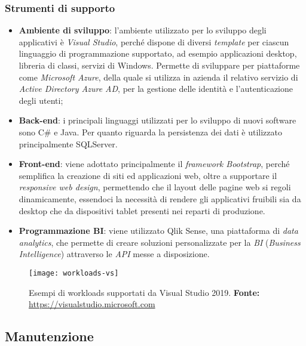 \subsubsection{Strumenti di supporto}
\begin{itemize}
	\item \textbf{Ambiente di sviluppo}: l'ambiente utilizzato per lo sviluppo degli applicativi è \textit{Visual Studio}, perché dispone di diversi \textit{template} per ciascun linguaggio di programmazione supportato, ad esempio applicazioni desktop, libreria di classi, servizi di Windows. Permette di sviluppare per piattaforme come \textit{Microsoft Azure}, della quale si utilizza in azienda il relativo servizio di \textit{Active Directory Azure AD}, per la gestione delle identità e l'autenticazione degli utenti;
	\item \textbf{Back-end}: i principali linguaggi utilizzati per lo sviluppo di nuovi software sono C\# e Java. 
	Per quanto riguarda la persistenza dei dati è utilizzato principalmente SQLServer.
	\item \textbf{Front-end}: viene adottato principalmente il \textit{framework Bootstrap}, perché semplifica la creazione di siti ed applicazioni web, oltre a supportare il \textit{responsive web design}, permettendo che il layout delle pagine web si regoli dinamicamente, essendoci la necessità di rendere gli applicativi fruibili sia da desktop che da dispositivi tablet presenti nei reparti di produzione.
	\item \textbf{Programmazione BI}: viene utilizzato Qlik Sense, una piattaforma di \textit{data analytics}, che permette di creare soluzioni personalizzate per la \textit{BI} (\textit{Business Intelligence}) attraverso le \textit{API} messe a disposizione.
\end{itemize}



\begin{figure}[htbp]
	\begin{center}
		\texttt{[image: workloads-vs]}
		\caption{Esempi di workloads supportati da Visual Studio 2019. \newline
		\textbf{Fonte: } \url{https://visualstudio.microsoft.com}}
	\end{center}
\end{figure}



\subsection{Manutenzione}
 
